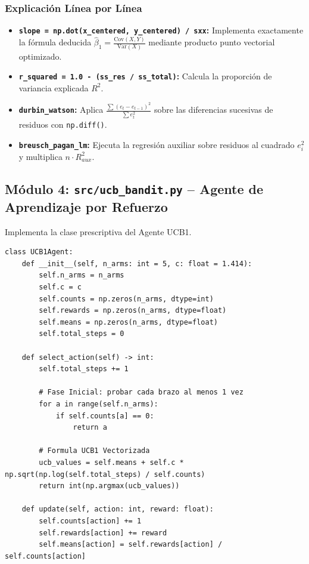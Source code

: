 \documentclass[12pt,letterpaper]{article}
\begin{document}
\subsubsection{Explicación Línea por Línea}
\begin{itemize}
	\item \textbf{\texttt{slope = np.dot(x\_centered, y\_centered) / sxx}:} Implementa exactamente la fórmula deducida $\hat{\beta}_1 = \frac{\text{Cov}(X,Y)}{\text{Var}(X)}$ mediante producto punto vectorial optimizado.
	\item \textbf{\texttt{r\_squared = 1.0 - (ss\_res / ss\_total)}:} Calcula la proporción de variancia explicada $R^2$.
	\item \textbf{\texttt{durbin\_watson}:} Aplica $\frac{\sum (e_t - e_{t-1})^2}{\sum e_t^2}$ sobre las diferencias sucesivas de residuos con \texttt{np.diff()}.
	\item \textbf{\texttt{breusch\_pagan\_lm}:} Ejecuta la regresión auxiliar sobre residuos al cuadrado $e_i^2$ y multiplica $n \cdot R^2_{aux}$.
\end{itemize}

\subsection{Módulo 4: \texttt{src/ucb\_bandit.py} -- Agente de Aprendizaje por Refuerzo}
Implementa la clase prescriptiva del Agente UCB1.

\begin{lstlisting}[caption={Clase UCB1Agent en src/ucb\_bandit.py}]
class UCB1Agent:
    def __init__(self, n_arms: int = 5, c: float = 1.414):
        self.n_arms = n_arms
        self.c = c
        self.counts = np.zeros(n_arms, dtype=int)
        self.rewards = np.zeros(n_arms, dtype=float)
        self.means = np.zeros(n_arms, dtype=float)
        self.total_steps = 0

    def select_action(self) -> int:
        self.total_steps += 1
        
        # Fase Inicial: probar cada brazo al menos 1 vez
        for a in range(self.n_arms):
            if self.counts[a] == 0:
                return a
        
        # Formula UCB1 Vectorizada
        ucb_values = self.means + self.c * np.sqrt(np.log(self.total_steps) / self.counts)
        return int(np.argmax(ucb_values))

    def update(self, action: int, reward: float):
        self.counts[action] += 1
        self.rewards[action] += reward
        self.means[action] = self.rewards[action] / self.counts[action]
\end{lstlisting}
\end{document}
